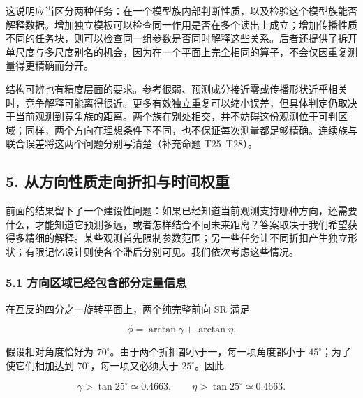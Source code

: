 \documentclass[11pt,a4paper]{article}
\begin{document}
这说明应当区分两种任务：在一个模型族内部判断性质，以及检验这个模型族能否解释数据。增加独立模板可以检查同一作用是否在多个读出上成立；增加传播性质不同的任务块，则可以检查同一组参数是否同时解释这些关系。后者还提供了拆开单尺度与多尺度别名的机会，因为在一个平面上完全相同的算子，不会仅因重复测量得更精确而分开。

结构可辨也有精度层面的要求。参考很弱、预测成分接近零或传播形状近乎相关时，竞争解释可能离得很近。更多有效独立重复可以缩小误差，但具体判定仍取决于当前观测到竞争族的距离。两个族在别处相交，并不妨碍这份观测位于可判区域；同样，两个方向在理想条件下不同，也不保证每次测量都足够精确。连续族与联合误差将这两个问题分别写清楚（补充命题
T25–T28）。

\subsection{5.
从方向性质走向折扣与时间权重}\label{ux4eceux65b9ux5411ux6027ux8d28ux8d70ux5411ux6298ux6263ux4e0eux65f6ux95f4ux6743ux91cd}

前面的结果留下了一个建设性问题：如果已经知道当前观测支持哪种方向，还需要什么，才能知道它预测多远，或者怎样结合不同未来距离？答案取决于我们希望获得多精细的解释。某些观测首先限制参数范围；另一些任务让不同折扣产生独立形状；有限记忆设计则使各个滞后分别可见。我们依次考虑这些情况。

\subsubsection{5.1
方向区域已经包含部分定量信息}\label{ux65b9ux5411ux533aux57dfux5df2ux7ecfux5305ux542bux90e8ux5206ux5b9aux91cfux4fe1ux606f}

\par
\noindent\begin{minipage}{\linewidth}

在互反的四分之一旋转平面上，两个纯完整前向 SR 满足

\[
\phi=\arctan\gamma+\arctan\eta.
\]

\end{minipage}\par

\par
\noindent\begin{minipage}{\linewidth}

假设相对角度恰好为 \(70^\circ\)。由于两个折扣都小于一，每一项角度都小于
\(45^\circ\)；为了使它们相加达到 \(70^\circ\)，每一项又必须大于
\(25^\circ\)。因此

\[
\gamma>\tan25^\circ\simeq0.4663,
\qquad \eta>\tan25^\circ\simeq0.4663.
\]

\end{minipage}\par
\end{document}
